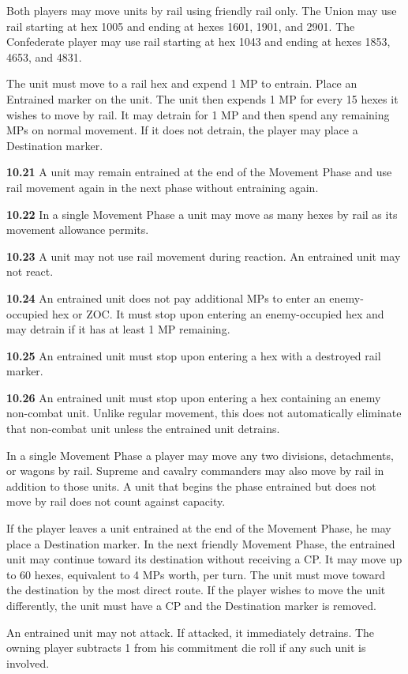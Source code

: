 
Both players may move units by rail using friendly rail only. The Union may use rail starting at hex 1005 and ending at hexes 1601, 1901, and 2901. The Confederate player may use rail starting at hex 1043 and ending at hexes 1853, 4653, and 4831.


The unit must move to a rail hex and expend 1 MP to entrain. Place an Entrained marker on the unit. The unit then expends 1 MP for every 15 hexes it wishes to move by rail. It may detrain for 1 MP and then spend any remaining MPs on normal movement. If it does not detrain, the player may place a Destination marker.


\textbf{10.21} A unit may remain entrained at the end of the Movement Phase and use rail movement again in the next phase without entraining again.

\textbf{10.22} In a single Movement Phase a unit may move as many hexes by rail as its movement allowance permits.

\textbf{10.23} A unit may not use rail movement during reaction. An entrained unit may not react.

\textbf{10.24} An entrained unit does not pay additional MPs to enter an enemy-occupied hex or ZOC. It must stop upon entering an enemy-occupied hex and may detrain if it has at least 1 MP remaining.

\textbf{10.25} An entrained unit must stop upon entering a hex with a destroyed rail marker.

\textbf{10.26} An entrained unit must stop upon entering a hex containing an enemy non-combat unit. Unlike regular movement, this does not automatically eliminate that non-combat unit unless the entrained unit detrains.


In a single Movement Phase a player may move any two divisions, detachments, or wagons by rail. Supreme and cavalry commanders may also move by rail in addition to those units. A unit that begins the phase entrained but does not move by rail does not count against capacity.


If the player leaves a unit entrained at the end of the Movement Phase, he may place a Destination marker. In the next friendly Movement Phase, the entrained unit may continue toward its destination without receiving a CP. It may move up to 60 hexes, equivalent to 4 MPs worth, per turn. The unit must move toward the destination by the most direct route. If the player wishes to move the unit differently, the unit must have a CP and the Destination marker is removed.


An entrained unit may not attack. If attacked, it immediately detrains. The owning player subtracts 1 from his commitment die roll if any such unit is involved.
